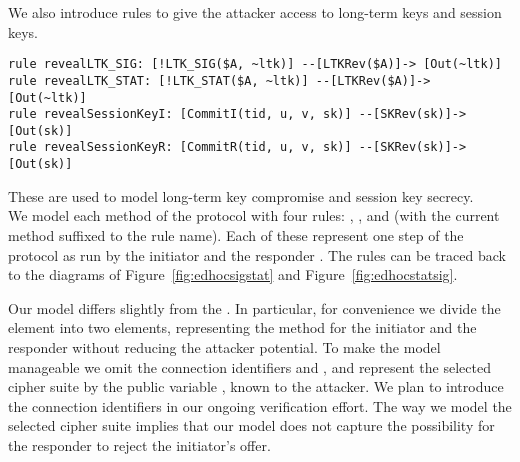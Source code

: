 {We also introduce rules to give the attacker access to
long-term keys and session keys.
%
\begin{lstlisting}
rule revealLTK_SIG: [!LTK_SIG($A, ~ltk)] --[LTKRev($A)]-> [Out(~ltk)]
rule revealLTK_STAT: [!LTK_STAT($A, ~ltk)] --[LTKRev($A)]-> [Out(~ltk)]
rule revealSessionKeyI: [CommitI(tid, u, v, sk)] --[SKRev(sk)]-> [Out(sk)]
rule revealSessionKeyR: [CommitR(tid, u, v, sk)] --[SKRev(sk)]-> [Out(sk)]
\end{lstlisting}
%
These are used to model long-term key compromise and session key secrecy.
\\

We model each method of the protocol with four rules: , , 
and  (with the current method suffixed to the rule name).
%
Each of these represent one step of the protocol as run by the initiator 
and the responder .
%
The rules can be traced back to the diagrams of
Figure~\ref{fig:edhocsigstat} and Figure~\ref{fig:edhocstatsig}.
%

Our model differs slightly from the \mSpec{}.
%
In particular, for convenience we divide the \mMethod{} element into two
elements, representing the method for the initiator and the responder without
reducing the attacker potential.
%
To make the model manageable we omit the connection identifiers \mCi{} and
\mCr{}, and represent the selected cipher suite by the public variable
, known to the attacker.
%
We plan to introduce the connection identifiers in our ongoing verification
effort.
%
The way we model the selected cipher suite implies that our model does not
capture the possibility for the responder to reject the initiator's offer. 
%

}
